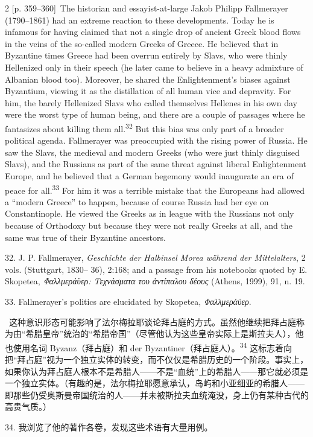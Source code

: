 \documentclass[10pt,a4paper]{article}
\begin{document}
\begin{paracol}{2}
{\scriptsize\color{gray}[p. 359–360]}\ The historian and essayist-at-large Jakob Philipp Fallmerayer (1790–1861) had an extreme reaction to these developments. Today he is infamous for having claimed that not a single drop of ancient Greek blood flows in the veins of the so-called modern Greeks of Greece. He believed that in Byzantine times Greece had been overrun entirely by Slavs, who were thinly Hellenized only in their speech (he later came to believe in a heavy admixture of Albanian blood too). Moreover, he shared the Enlightenment’s biases against Byzantium, viewing it as the distillation of all human vice and depravity. For him, the barely Hellenized Slavs who called themselves Hellenes in his own day were the worst type of human being, and there are a couple of passages where he fantasizes about killing them all.\nobreak\textsuperscript{32} But this bias was only part of a broader political agenda. Fallmerayer was preoccupied with the rising power of Russia. He saw the Slavs, the medieval and modern Greeks (who were just thinly disguised Slavs), and the Russians as part of the same threat against liberal Enlightenment Europe, and he believed that a German hegemony would inaugurate an era of peace for all.\nobreak\textsuperscript{33} For him it was a terrible mistake that the Europeans had allowed a “modern Greece” to happen, because of course Russia had her eye on Constantinople. He viewed the Greeks as in league with the Russians not only because of Orthodoxy but because they were not really Greeks at all, and the same was true of their Byzantine ancestors.\par{\small 32. J. P. Fallmerayer, \textit{Geschichte der Halbinsel Morea während der Mittelalters}, 2 vols. (Stuttgart, 1830– 36), 2:168; and a passage from his notebooks quoted by E. Skopetea, \textit{Φαλλμεράϋερ: Τεχνάσματα του ἀντίπαλου δέους} (Athens, 1999), 91, n. 19.\par}{\small 33. Fallmerayer’s politics are elucidated by Skopetea, \textit{Φαλλμεράϋερ}.\par}
\switchcolumn*
{\scriptsize\color{gray}[p. 360]}\ 这种意识形态可能影响了法尔梅拉耶谈论拜占庭的方式。虽然他继续把拜占庭称为由“希腊皇帝”统治的“希腊帝国”（尽管他认为这些皇帝实际上是斯拉夫人），他也使用名词 Byzanz（拜占庭）和 der Byzantiner（拜占庭人）。\nobreak\textsuperscript{34} 这标志着向把“拜占庭”视为一个独立实体的转变，而不仅仅是希腊历史的一个阶段。事实上，如果你认为拜占庭人根本不是希腊人——不是“血统”上的希腊人——那它就必须是一个独立实体。（有趣的是，法尔梅拉耶愿意承认，岛屿和小亚细亚的希腊人——即那些仍受奥斯曼帝国统治的人——并未被斯拉夫血统淹没，身上仍有某种古代的高贵气质。）\par{\small 34. 我浏览了他的著作各卷，发现这些术语有大量用例。\par}

\end{paracol}
\end{document}
